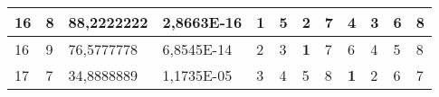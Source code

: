 \documentclass[conference]{IEEEtran}
\begin{document}
\begin{table*}[]
\begin{tabular}{|llll|llllllll|}
\multicolumn{1}{|l|}{16}                                                    & \multicolumn{1}{l|}{8}                                                        & \multicolumn{1}{l|}{88,2222222}                                                   & 2,8663E-16                     & \multicolumn{1}{l|}{\textbf{1}}                                         & \multicolumn{1}{l|}{5}                                                  & \multicolumn{1}{l|}{2}                                                  & \multicolumn{1}{l|}{7}                                                  & \multicolumn{1}{l|}{4}                                                  & \multicolumn{1}{l|}{3}                                                  & \multicolumn{1}{l|}{6}                                                  & 8                          \\ \hline
\multicolumn{1}{|l|}{16}                                                    & \multicolumn{1}{l|}{9}                                                        & \multicolumn{1}{l|}{76,5777778}                                                   & 6,8545E-14                     & \multicolumn{1}{l|}{2}                                                  & \multicolumn{1}{l|}{3}                                                  & \multicolumn{1}{l|}{\textbf{1}}                                         & \multicolumn{1}{l|}{7}                                                  & \multicolumn{1}{l|}{6}                                                  & \multicolumn{1}{l|}{4}                                                  & \multicolumn{1}{l|}{5}                                                  & 8                          \\ \hline
\multicolumn{1}{|l|}{17}                                                    & \multicolumn{1}{l|}{7}                                                        & \multicolumn{1}{l|}{34,8888889}                                                   & 1,1735E-05                     & \multicolumn{1}{l|}{3}                                                  & \multicolumn{1}{l|}{4}                                                  & \multicolumn{1}{l|}{5}                                                  & \multicolumn{1}{l|}{8}                                                  & \multicolumn{1}{l|}{\textbf{1}}                                         & \multicolumn{1}{l|}{2}                                                  & \multicolumn{1}{l|}{6}                                                  & 7                          \\ \hline

\end{tabular}
\end{table*}
\end{document}
